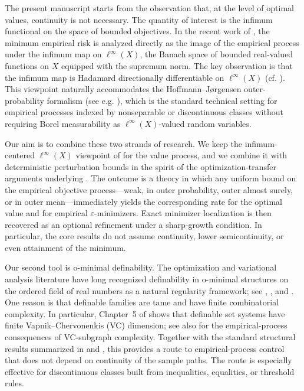 \documentclass[11pt]{article}
\begin{document}
The present manuscript starts from the observation that, at the level
of optimal values, continuity is not necessary. The quantity of interest
is the infimum functional on the space of bounded objectives. In the
recent work of \citet{Westerhout2024}, the minimum empirical risk
is analyzed directly as the image of the empirical process under the
infimum map on $\ell^{\infty}(X)$, the Banach space of bounded real-valued
functions on $X$ equipped with the supremum norm. The key observation
is that the infimum map is Hadamard directionally differentiable on
$\ell^{\infty}(X)$ (cf. \citealp[Theorem~3.1]{Westerhout2024}).
This viewpoint naturally accommodates the Hoffmann--Jørgensen outer-probability
formalism (see e.g. \citealp{vdVW2023}), which is the standard technical
setting for empirical processes indexed by nonseparable or discontinuous
classes without requiring Borel measurability as $\ell^{\infty}(X)$-valued
random variables.

Our aim is to combine these two strands of research. We keep the infimum-centered
$\ell^{\infty}(X)$ viewpoint of \citet{Westerhout2024} for the value
process, and we combine it with deterministic perturbation bounds
in the spirit of the optimization-transfer arguments underlying \citet{Banholzer2022}.
The outcome is a theory in which any uniform bound on the empirical
objective process---weak, in outer probability, outer almost surely, or in
outer mean---immediately yields the corresponding rate for the optimal
value and for empirical $\varepsilon$-minimizers. Exact minimizer
localization is then recovered as an optional refinement under a sharp-growth
condition. In particular, the core results do not assume continuity,
lower semicontinuity, or even attainment of the minimum.

Our second tool is o-minimal definability. The optimization and variational
analysis literature have long recognized definability in o-minimal
structures on the ordered field of real numbers as a natural regularity
framework; see \citet{Ioffe2009}, \citet{BolteDaniilidisLewis2009},
and \citet{BoltePauwels2016}. One reason is that definable families
are tame and have finite combinatorial complexity. In particular,
Chapter~5 of \citet{vdDries1998} shows that definable set systems
have finite Vapnik--Chervonenkis (VC) dimension; see also \citet[Section~2.6]{vdVW2023}
for the empirical-process consequences of VC-subgraph complexity.
Together with the standard structural results summarized in \citet{LeLoi2010}
and \citet[Chapter~8]{Pila2022}, this provides a route to empirical-process
control that does not depend on continuity of the sample paths. The
route is especially effective for discontinuous classes built from
inequalities, equalities, or threshold rules.
\end{document}
